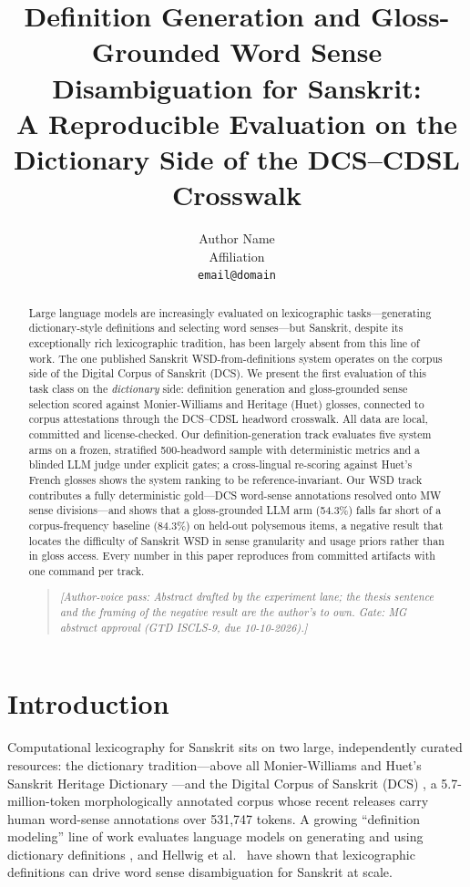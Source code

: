 \documentclass[11pt]{article}
\title{Definition Generation and Gloss-Grounded Word Sense Disambiguation for Sanskrit:\\
A Reproducible Evaluation on the Dictionary Side of the DCS--CDSL Crosswalk}
\author{Author Name \\
  Affiliation \\
  {\tt email@domain}}
\date{}
\newcommand{\avnote}[1]{\begin{quote}\small\itshape [Author-voice pass: #1]\end{quote}}
\begin{document}
\maketitle

\begin{abstract}
Large language models are increasingly evaluated on lexicographic tasks---generating
dictionary-style definitions and selecting word senses---but Sanskrit, despite its
exceptionally rich lexicographic tradition, has been largely absent from this line of
work. The one published Sanskrit WSD-from-definitions system operates on the corpus side
of the Digital Corpus of Sanskrit (DCS). We present the first evaluation of this task
class on the \emph{dictionary} side: definition generation and gloss-grounded sense
selection scored against Monier-Williams and Heritage (Huet) glosses, connected to corpus
attestations through the DCS--CDSL headword crosswalk. All data are local, committed and
license-checked. Our definition-generation track evaluates five system arms on a frozen,
stratified 500-headword sample with deterministic metrics and a blinded LLM judge under
explicit gates; a cross-lingual re-scoring against Huet's French glosses shows the system
ranking to be reference-invariant. Our WSD track contributes a fully deterministic
gold---DCS word-sense annotations resolved onto MW sense divisions---and shows that a
gloss-grounded LLM arm (54.3\%) falls far short of a corpus-frequency baseline (84.3\%)
on held-out polysemous items, a negative result that locates the difficulty of Sanskrit
WSD in sense granularity and usage priors rather than in gloss access. Every number in
this paper reproduces from committed artifacts with one command per track.
\avnote{Abstract drafted by the experiment lane; the thesis sentence and the framing of
the negative result are the author's to own. Gate: MG abstract approval (GTD ISCLS-9,
due 10-10-2026).}
\end{abstract}

\section{Introduction}

Computational lexicography for Sanskrit sits on two large, independently curated
resources: the dictionary tradition---above all Monier-Williams
\cite{monier-williams-1899} and Huet's Sanskrit Heritage Dictionary
\cite{huet-2026-heritage}---and the Digital Corpus of Sanskrit (DCS)
\cite{hellwig-dcs}, a 5.7-million-token morphologically annotated corpus whose recent
releases carry human word-sense annotations over 531{,}747 tokens. A growing
``definition modeling'' line of work evaluates language models on generating and using
dictionary definitions \cite{periti-etal-2025-definition,liu-etal-2026-lm}, and Hellwig
et al.\ \cite{hellwig-etal-2026-sanskrit} have shown that lexicographic definitions can
drive word sense disambiguation for Sanskrit at scale.
\end{document}
